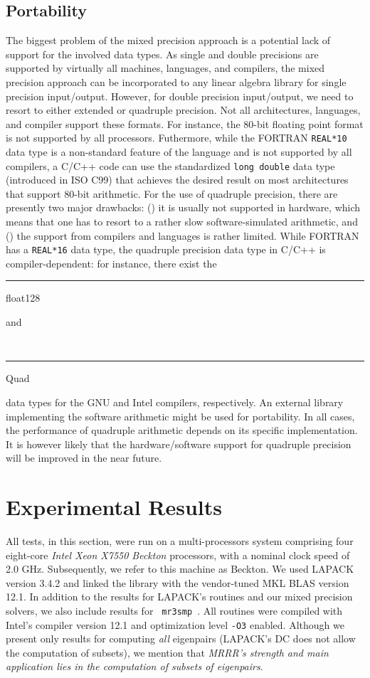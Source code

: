 \documentclass[final]{siamltex}
\begin{document}
\subsection{Portability} The biggest problem of the mixed precision approach
is a potential lack of support for the involved data types. As single and
double precisions are supported by 
virtually all machines, languages, and compilers, the mixed precision
approach can be incorporated to any linear algebra library for single
precision input/output. However, for double precision input/output, we
need to resort to either 
extended or quadruple precision.  
Not all architectures, languages, and compiler support these formats. For
instance, the 80-bit floating point format is not supported by all
processors. Futhermore, while the FORTRAN {\tt REAL*10} data
type is a non-standard feature of the language and is not supported by all
compilers, a C/C++ code can use the standardized {\tt long double} data type
(introduced in ISO C99) that achieves the 
desired result on most architectures that support 80-bit arithmetic. 
For the use of quadruple precision, there are presently two major drawbacks:
() it is usually not supported in hardware, which means that one has to resort to
a rather slow software-simulated arithmetic, and () the support from compilers  
and languages is rather limited. 
While FORTRAN has a {\tt REAL*16}
data type, the quadruple precision data type in C/C++ is compiler-dependent:
  for instance, there exist the {\tt \rule{8pt}{0.5pt}float128} and {\tt
  \rule{4pt}{0.5pt}Quad} data types for the GNU and Intel
compilers, respectively. An external library implementing the
software arithmetic might be used for portability. In all cases, the
performance of quadruple arithmetic depends on its specific 
implementation. It is however likely that the hardware/software support for
quadruple precision will be improved in the near future.  




\section{Experimental Results}
\label{sec:experiments}

All tests, in this section, were run on a multi-processors system comprising four
eight-core {\it Intel Xeon X7550 Beckton} processors, with a nominal clock
speed of 2.0 GHz. 
Subsequently, we refer to this
machine as {\sc Beckton}. We used LAPACK version
3.4.2 and linked the library with the vendor-tuned MKL BLAS version
12.1. In addition to the results for LAPACK's routines and our mixed
precision solvers, we also include results for {\tt
mr3smp}~\cite{mr3smp}. All routines were compiled with
Intel's compiler version 12.1 and optimization level {\tt -O3} enabled.
Although we present only results for computing {\it all}
eigenpairs (LAPACK's DC does not allow the computation of subsets), we
mention that {\it MRRR's strength and main application lies in the
  computation of subsets of 
eigenpairs}. 
\end{document}
